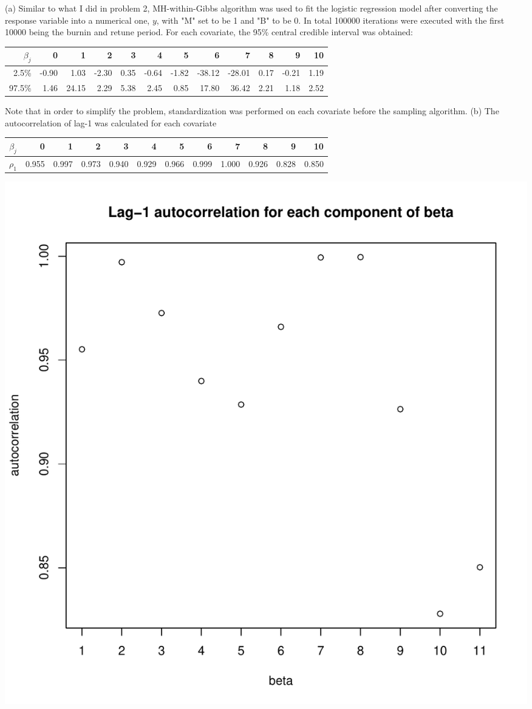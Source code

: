 \documentclass[12pt]{article}
\begin{document}
(a) Similar to what I did in problem 2, MH-within-Gibbs algorithm was used to fit the logistic regression model after converting the response variable into a numerical one, $y$, with "M" set to be 1 and "B" to be 0. In total 100000 iterations were executed with the first 10000 being the burnin and retune period. For each covariate, the 95\% central credible interval was obtained:
\begin{table}[ht]
\centering
\begin{tabular}{rrrrrrrrrrrr}
  \hline
 $\beta_j$ & 0 & 1 & 2 & 3 & 4 & 5 & 6 & 7 & 8 & 9 & 10 \\ 
  \hline
2.5\% & -0.90 & 1.03 & -2.30 & 0.35 & -0.64 & -1.82 & -38.12 & -28.01 & 0.17 & -0.21 & 1.19 \\ 
  97.5\% & 1.46 & 24.15 & 2.29 & 5.38 & 2.45 & 0.85 & 17.80 & 36.42 & 2.21 & 1.18 & 2.52 \\ 
   \hline
\end{tabular}
\end{table}
\newline
Note that in order to simplify the problem, standardization was performed on each covariate before the sampling algorithm. \newline
(b) The autocorrelation of lag-1 was calculated for each covariate
\begin{table}[ht]
\centering
\begin{tabular}{rrrrrrrrrrrr}
  \hline
 $\beta_j$ & 0 & 1 & 2 & 3 & 4 & 5 & 6 & 7 & 8 & 9 & 10 \\ 
  \hline
$\rho_1$ & 0.955 & 0.997 & 0.973 & 0.940 & 0.929 & 0.966 & 0.999 & 1.000 & 0.926 & 0.828 & 0.850 \\ 
   \hline
\end{tabular}
\end{table}
 \newline
\includegraphics[width=\textwidth]{pb3_acf_plot.pdf} \newline
\end{document}
